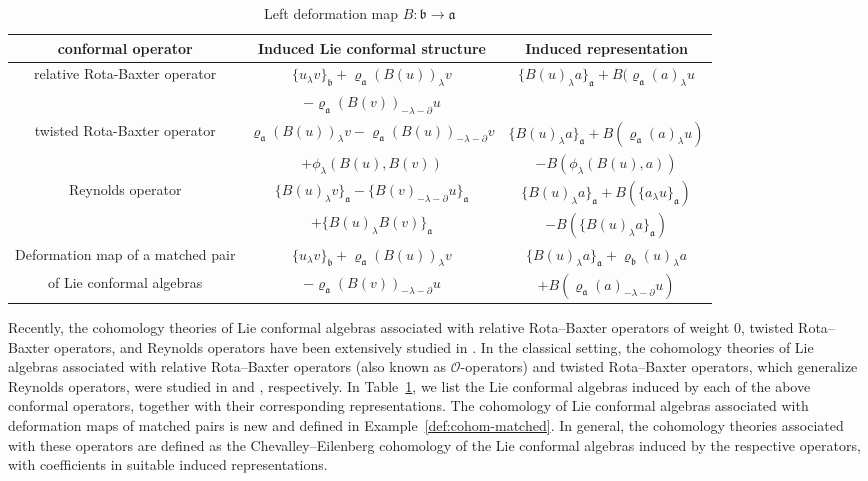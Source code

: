 \documentclass[a4paper,11pt]{article}
\def\Vs{\mathfrak{a}}
\def\Ws{\mathfrak{b}}
\def\rep{\varrho}
\def\la{\lambda}
\def\p{\partial}
\numberwithin{equation}{section}
\begin{document}
\begin{table}[ht]
\centering
\caption{Left deformation map $B:\Ws\to\Vs$}
\label{tab2}
\begin{tabular}{|c|c|c|}
\hline
 conformal operator & Induced Lie conformal  structure&  Induced representation\\
\hline
  relative Rota-Baxter operator & $\{u_\la v\}_\Ws + \rep_\Vs(B(u))_\la v
$&  $\{B(u)_\la a\}_\Vs + B(\rep_\Vs(a)_\la u$\\
   & $
- \rep_\Vs(B(v))_{-\la-\p}u$&  \\\hline
  twisted Rota-Baxter operator& $\rep_\Vs(B(u))_\la v - \rep_\Vs(B(u))_{-\la-\p}v
$&  $\{B(u)_\la a\}_\Vs + B(\rep_\Vs(a)_\la u)
$\\& $
+ \phi_\la(B(u),B(v))$&  $
- B(\phi_\la(B(u),a))$\\\hline
  Reynolds operator & $\{B(u)_\la v\}_\Vs - \{B(v)_{-\la-\p}u\}_\Vs
$&  $\{B(u)_\la a\}_\Vs + B(\{a_\la u\}_\Vs)
$\\
  & $+ \{B(u)_\la B(v)\}_\Vs$&  $
- B(\{B(u)_\la a\}_\Vs)$\\
 \hline Deformation map of a matched pair  & $\{u_\la v\}_\Ws + \rep_\Vs(B(u))_\la v
$  &  $\{B(u)_\la a\}_\Vs + \rep_\Ws(u)_\la a 
$\\
 of Lie conformal  algebras & $- \rep_\Vs(B(v))_{-\la-\p}u$&  $
 +B(\rep_\Vs(a)_{-\la-\p}u)$\\
 \hline
\end{tabular}
\end{table}

Recently, the cohomology theories of Lie conformal algebras associated with relative Rota--Baxter operators of weight $0$, twisted Rota--Baxter operators, and Reynolds operators have been extensively studied in \cite{YL}. In the classical setting, the cohomology theories of Lie algebras associated with relative Rota--Baxter operators (also known as $\mathcal{O}$-operators) and twisted Rota--Baxter operators, which generalize Reynolds operators, were studied in \cite{TBGS} and \cite{Das21}, respectively.
In Table~\ref{tab2}, we list the Lie conformal algebras induced by each of the above conformal operators, together with their corresponding representations. The cohomology of Lie conformal algebras associated with deformation maps of matched pairs is new and defined in Example~\ref{def:cohom-matched}. In general, the cohomology theories associated with these operators are defined as the Chevalley--Eilenberg cohomology of the Lie conformal algebras induced by the respective operators, with coefficients in suitable induced representations.
\end{document}
